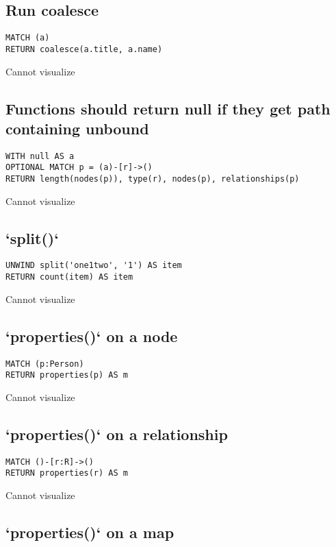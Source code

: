 \subsection{Run coalesce}

\begin{lstlisting}
MATCH (a)
RETURN coalesce(a.title, a.name)
\end{lstlisting}

Cannot visualize
\subsection{Functions should return null if they get path containing unbound}

\begin{lstlisting}
WITH null AS a
OPTIONAL MATCH p = (a)-[r]->()
RETURN length(nodes(p)), type(r), nodes(p), relationships(p)
\end{lstlisting}

Cannot visualize
\subsection{`split()`}

\begin{lstlisting}
UNWIND split('one1two', '1') AS item
RETURN count(item) AS item
\end{lstlisting}

Cannot visualize
\subsection{`properties()` on a node}

\begin{lstlisting}
MATCH (p:Person)
RETURN properties(p) AS m
\end{lstlisting}

Cannot visualize
\subsection{`properties()` on a relationship}

\begin{lstlisting}
MATCH ()-[r:R]->()
RETURN properties(r) AS m
\end{lstlisting}

Cannot visualize
\subsection{`properties()` on a map}

